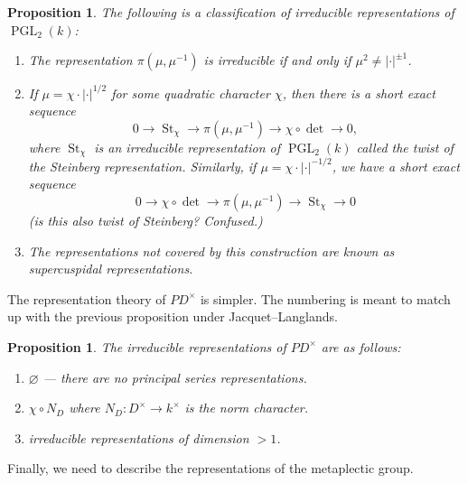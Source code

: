 \documentclass[11pt,a4paper,leqno]{article}
\newcommand{\1}{\mathbbm{1}}
\renewcommand{\emptyset}{\varnothing}
\DeclareMathOperator{\St}{St}
\DeclareMathOperator{\PGL}{PGL}
\theoremstyle{plain}
\newtheorem{prop}[theorem]{Proposition}
\theoremstyle{definition}
\theoremstyle{remark}
\numberwithin{equation}{section}
\begin{document}
\begin{prop}
  The following is a classification of irreducible representations of
  $\PGL_{2}(k)$: 
  \begin{enumerate}
  \item The representation $\pi(\mu,\mu^{-1})$ is irreducible if and only if $\mu^{2}
\ne |\cdot|^{\pm1}$. 
\item If $\mu = \chi \cdot |\cdot |^{1/2}$ for some quadratic character $\chi$, then
  there is a short exact sequence
  \begin{equation}
    \label{eq:22}
0 \to \St_{\chi} \to \pi(\mu, \mu^{-1}) \to \chi \circ \det \to 0,
  \end{equation}
where $\St_{\chi}$ is an irreducible representation of $\PGL_{2}(k)$
called the \emph{twist of the Steinberg representation}. Similarly, if
$\mu = \chi \cdot |\cdot|^{-1/2}$, we have a short exact sequence
\begin{equation}
  \label{eq:23}
  0 \to \chi \circ \det \to \pi(\mu,\mu^{-1}) \to \St_{\chi} \to 0
\end{equation}
(is this also twist of Steinberg? Confused.)
\item The representations not covered by this construction are known
  as \emph{supercuspidal representations}. 
  \end{enumerate}
\end{prop}

The representation theory of $PD^{\times}$ is simpler. The numbering is
meant to match up with the previous proposition under Jacquet--Langlands.

\begin{prop}
  The irreducible representations of $PD^{\times}$ are as follows:
  \begin{enumerate}
  \item $\emptyset$ --- there are no principal series representations. 
  \item $\chi\circ N_{D}$ where $N_{D} \colon D^{\times} \to k^{\times}$ is the norm
    character.
  \item irreducible representations of dimension $>1$.
  \end{enumerate}
\end{prop}
Finally, we need to describe the representations of the metaplectic
group.
\end{document}
